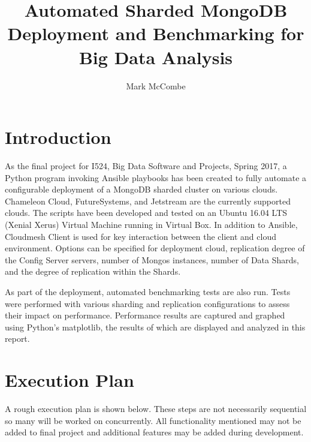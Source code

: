 \documentclass[9pt,twocolumn,twoside]{styles/osajnl}
\title{Automated Sharded MongoDB Deployment and Benchmarking for Big Data Analysis}
\author[1,*]{Mark McCombe}
\affil[1]{School of Informatics and Computing, Bloomington, IN 47408, U.S.A.}
\affil[*]{Corresponding authors: laszewski@gmail.com}
\begin{document}
\maketitle

\section{Introduction}

As the final project for I524, Big Data Software and Projects, Spring 2017, a Python program invoking Ansible playbooks has been created to fully automate a configurable deployment of a MongoDB sharded cluster on various clouds.  Chameleon Cloud, FutureSystems, and Jetstream are the currently supported clouds.  The scripts have been developed and tested on an Ubuntu 16.04 LTS (Xenial Xerus) Virtual Machine running in Virtual Box.  In addition to Ansible, Cloudmesh Client is used for key interaction between the client and cloud environment.  Options can be specified  for deployment cloud, replication degree of the Config Server servers, number of Mongos instances, number of Data Shards, and the degree of replication within the Shards.

As part of the deployment, automated benchmarking tests are also run.  Tests were performed with various sharding and replication configurations to assess their impact on performance.  Performance results are captured and graphed using Python's matplotlib, the results of which are displayed and analyzed in this report.

\section{Execution Plan}

A rough execution plan is shown below.  These steps are not necessarily sequential so many will be worked on concurrently.  All functionality mentioned may not be added to final project and additional features may be added during development.
\end{document}
